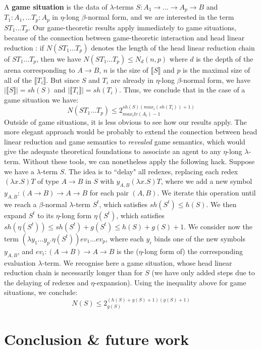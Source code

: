\documentclass{article}
\newcommand{\intr}[1]{\llbracket #1 \rrbracket}
\begin{document}
A \textbf{game situation} \cite{phd} is the data of $\lambda$-terms $S:A_1 \to \dots \to A_p \to B$ and $T_1: A_1, \dots T_p:A_p$ in $\eta$-long $\beta$-normal form, and we are interested
in the term $S T_1 \dots T_p$.  Our game-theoretic results
apply immediately to game situations, because of the connection between game-theoretic interaction and head linear reduction \cite{danosregnier}:
if $N(S T_1 \dots T_p)$ denotes the length of the head linear reduction chain of $S T_1 \dots T_p$, then we have 
$N(S T_1 \dots T_p) \leq N_d(n, p)$ where
$d$ is the depth of the arena corresponding to $A\to B$, $n$ is the size of $\intr{S}$ and $p$ is the maximal size of all of the $\intr{T_i}$. But since $S$ and $T_i$ are already in $\eta$-long
$\beta$-normal form, we have $|\intr{S}| = sh(S)$ and $|\intr{T_i}| = sh(T_i)$. Thus, we conclude that in the case of a game situation we have:
\[
N(S T_1 \dots T_p) \leq 2_{max_i lv(A_i)-1}^{sh(S)(max_i(sh(T_i))+1)}
\]
Outside of game situations, it is less obvious to see how our results apply. The more elegant approach would be probably to extend the connection between head linear reduction
and game semantics to \emph{revealed} game semantics, which would give the adequate theoretical foundations to associate an agent to any $\eta$-long $\lambda$-term. Without
these tools, we can nonetheless apply the following hack. Suppose we have a $\lambda$-term $S$. The idea is to ``delay" all redexes, replacing each redex $(\lambda x. S) T$ of type $A\to B$ in $S$ with 
$y_{A, B} (\lambda x.S) T$, where we add a new symbol $y_{A, B}: (A\to B) \to A \to B$ for each pair $(A, B)$. We iterate this operation until we reach a $\beta$-normal $\lambda$-term $S^t$, which satisfies $sh(S^t) \leq h(S)$.
We then expand $S^t$ to its $\eta$-long form $\eta(S^t)$, which satisfies $sh(\eta(S^t)) \leq sh(S^t)+g(S^t) \leq h(S) + g(S) + 1$. We consider now the term $(\lambda y_1 \dots y_p. \eta(S^t)) ev_1 \dots ev_p$, 
where each $y_i$ binds one of the new symbols $y_{A, B}$, and $ev_i:(A \to B) \to A \to B$ is the ($\eta$-long form of) the corresponding evaluation $\lambda$-term. We recognise here a game situation, whose head linear
reduction chain is necessarily longer than for $S$ (we have only added steps due to the delaying of redexes and $\eta$-expansion). Using the inequality above for game situations, we conclude:
\[
N(S) \leq 2_{g(S)}^{(h(S) + g(S) + 1)(g(S) + 1)}
\]

\section{Conclusion \& future work}
\end{document}
